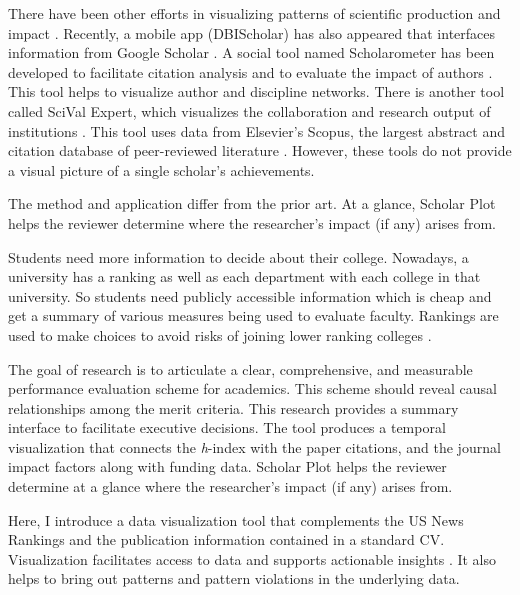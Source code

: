 There have been other efforts in visualizing patterns of scientific production and impact \cite{Katy:2010, Chen:2001, Leydesdorff:2007}. Recently, a mobile app (DBIScholar) has also appeared that interfaces information from Google Scholar \cite{sabrina741}. A social tool named Scholarometer has been developed to facilitate citation analysis and to evaluate the impact of authors \cite{Kaur:2014}. This tool helps to visualize author and discipline networks. There is another tool called SciVal Expert, which visualizes the collaboration and research output of institutions \cite{Vardell:2011}. This tool uses data from Elsevier's Scopus, the largest abstract and citation database of peer-reviewed literature \cite{Scopu91:online}. However, these tools do not provide a visual picture of a single scholar's achievements.

The method and application differ from the prior art. At a glance, Scholar Plot helps the reviewer determine where the researcher's impact (if any) arises from.%

Students need more information to decide about their college. Nowadays, a university has a ranking as well as each department with each college in that university. So students need publicly accessible information which is cheap and get a summary of various measures being used to evaluate faculty. Rankings are used to make choices to avoid risks of joining lower ranking colleges \cite{mcdonough1998college}.

The goal of research is to articulate a clear, comprehensive, and measurable performance evaluation scheme for academics. This scheme should reveal causal relationships among the merit criteria. This research provides a summary interface to facilitate executive decisions. The tool produces a temporal visualization that connects the {\it h}-index with the paper citations, and the journal impact factors along with funding data. Scholar Plot helps the reviewer determine at a glance where the researcher's impact (if any) arises from.


Here, I introduce a data visualization tool that complements the US News Rankings and the publication information contained in a standard CV. Visualization facilitates access to data and supports actionable insights \cite{Yi:2008:UCI}. It also helps to bring out patterns and pattern violations in the underlying data.
